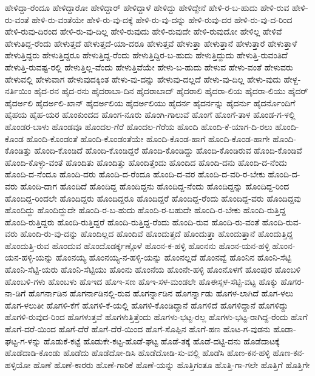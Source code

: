 ಹೇಳಿದ್ದಾ-ರೆಂದೂ
ಹೇಳಿದ್ದಾರೋ
ಹೇಳಿದ್ದಾರ್
ಹೇಳಿದ್ದಾಳೆ
ಹೇಳಿದ್ದು
ಹೇಳಿದ್ದೇನೆ
ಹೇಳಿ-ರ-ಬ-ಹುದು
ಹೇಳಿ-ರುವ
ಹೇಳಿ-ರು-ವಂತೆ
ಹೇಳಿ-ರು-ವಂತೆಯೇ
ಹೇಳಿ-ರು-ವು-ದಕ್ಕೆ
ಹೇಳಿ-ರು-ವು-ದನ್ನು
ಹೇಳಿ-ರುವು-ದರ
ಹೇಳಿ-ರು-ವು-ದ-ರಿಂದ
ಹೇಳಿ-ರುವು-ದಿರಂದ
ಹೇಳಿ-ರು-ವು-ದಿಲ್ಲ
ಹೇಳಿ-ರುವುದು
ಹೇಳಿ-ರುವುದೇ
ಹೇಳಿ-ರುವುದೋ
ಹೇಳಿಲ್ಲ
ಹೇಳಿವೆ
ಹೇಳುತಿದ್ದ-ರೆಂದು
ಹೇಳುತ್ತದೆ
ಹೇಳುತ್ತದೆ-ಯಾ-ದರೂ
ಹೇಳುತ್ತವೆ
ಹೇಳುತ್ತಾ
ಹೇಳುತ್ತಾನೆ
ಹೇಳುತ್ತಾರೆ
ಹೇಳುತ್ತಾಳೆ
ಹೇಳುತ್ತಿದ್ದರು
ಹೇಳುತ್ತಿದ್ದರೂ
ಹೇಳುತ್ತಿದ್ದ-ರೆಂದು
ಹೇಳುತ್ತಿದ್ದಿರ-ಬ-ಹುದು
ಹೇಳುತ್ತಿದ್ದುದು
ಹೇಳುತ್ತಿ-ರುವಂತಿದೆ
ಹೇಳುತ್ತಿ-ರುವಷ್ಟ-ರಲ್ಲಿ
ಹೇಳುತ್ತಿಲ್ಲ-ವೆಂದು
ಹೇಳುತ್ತಿವೆಯೇ
ಹೇಳು-ಬ-ಹುದು
ಹೇಳುವ
ಹೇಳು-ವಂತೆ
ಹೇಳುವರು
ಹೇಳುವಲ್ಲಿ
ಹೇಳುವಾಗ
ಹೇಳುವುದಕ್ಕಿಂತ
ಹೇಳು-ವು-ದನ್ನು
ಹೇಳುವು-ದಲ್ಲದೆ
ಹೇಳು-ವು-ದಿಲ್ಲ
ಹೇಳು-ವುದು
ಹೇಳ್ದ-ನರ್ತಿಯಿಂ
ಹೈದ-ರನ
ಹೈದ-ರನು
ಹೈದರಾಬಾ-ದಿನ
ಹೈದರಾಬಾದ್
ಹೈದರಾಲಿ
ಹೈದರಾ-ಲಿಯ
ಹೈದರಾ-ಲಿಯು
ಹೈದರ್
ಹೈದರ್ಅಲಿ
ಹೈದರ್ಅಲಿ-ಖಾನ್
ಹೈದರ್ಅಲಿಯ
ಹೈದರ್ಅಲಿಯು
ಹೈದರ್ನ
ಹೈದರ್ನನ್ನು
ಹೈದರ್ನು
ಹೈದರ್ನೊಂದಿಗೆ
ಹೈಹಯ
ಹೈಹ-ಯರ
ಹೊಂಕುಂದದ
ಹೊಂಗ-ನೂರು
ಹೊಂಗಿ-ಗಾಲುವೆ
ಹೊಂಗೆ
ಹೊಂಗೆ-ತಾಳ
ಹೊಂಡ-ಗ-ಳಲ್ಲಿ
ಹೊಂಡರ-ಬಾಳು
ಹೊಂಡವೂ
ಹೊಂದಲ-ಗೆರೆ
ಹೊಂದಲ-ಗೆರೆಯ
ಹೊಂದಿ
ಹೊಂದಿ-ಕೆ-ಯಾಗ-ದಿ-ರಲು
ಹೊಂದಿ-ಕೊಂಡ
ಹೊಂದಿ-ಕೊಂಡಂತೆ
ಹೊಂದಿ-ಕೊಂಡಂತೆಯೇ
ಹೊಂದಿ-ಕೊಂಡ-ಹಾಗೆ
ಹೊಂದಿ-ಕೊಂಡ-ಹಾಗೇ
ಹೊಂದಿ-ಕೊಂಡಿತ್ತು
ಹೊಂದಿ-ಕೊಂಡಿದೆ
ಹೊಂದಿ-ಕೊಂಡಿದ್ದರೆ
ಹೊಂದಿ-ಕೊಂಡಿದ್ದು
ಹೊಂದಿ-ಕೊಂಡಿರುವ
ಹೊಂದಿ-ಕೊಂಡಿವೆ
ಹೊಂದಿ-ಕೊಳ್ಳು-ವಂತೆ
ಹೊಂದಿತು
ಹೊಂದಿತ್ತು
ಹೊಂದಿತ್ತೆಂದು
ಹೊಂದಿದ
ಹೊಂದಿ-ದನು
ಹೊಂದಿ-ದ-ನೆಂದು
ಹೊಂದಿ-ದ-ನೆಂದೂ
ಹೊಂದಿ-ದರು
ಹೊಂದಿ-ದ-ರೆಂದೂ
ಹೊಂದಿ-ದ-ವರ
ಹೊಂದಿ-ದ-ವರಿ-ರ-ಬೇಕು
ಹೊಂದಿ-ದ-ವರು
ಹೊಂದಿ-ದಾಗ
ಹೊಂದಿದೆ
ಹೊಂದಿದ್ದ
ಹೊಂದಿದ್ದನು
ಹೊಂದಿದ್ದ-ನೆಂದು
ಹೊಂದಿದ್ದನ್ನು
ಹೊಂದಿದ್ದ-ರಿಂದ
ಹೊಂದಿದ್ದ-ರಿಂದಲೇ
ಹೊಂದಿದ್ದರು
ಹೊಂದಿದ್ದರೂ
ಹೊಂದಿದ್ದರೆ
ಹೊಂದಿದ್ದ-ರೆಂದು
ಹೊಂದಿದ್ದ-ವರು
ಹೊಂದಿದ್ದವು
ಹೊಂದಿದ್ದು
ಹೊಂದಿದ್ದುದೇ
ಹೊಂದಿ-ರ-ಬ-ಹುದು
ಹೊಂದಿ-ರ-ಬಹುದೇ
ಹೊಂದಿ-ರ-ಬೇಕು
ಹೊಂದಿ-ರುತ್ತಿದ್ದ
ಹೊಂದಿ-ರುತ್ತಿದ್ದರು
ಹೊಂದಿ-ರುತ್ತಿದ್ದರೆ
ಹೊಂದಿ-ರುತ್ತಿದ್ದ-ರೆಂದು
ಹೊಂದಿ-ರುವ
ಹೊಂದಿ-ರು-ವಂತೆ
ಹೊಂದಿ-ರುವ-ವರು
ಹೊಂದಿ-ರು-ವು-ದನ್ನು
ಹೊಂದಿಲ್ಲದ
ಹೊಂದಿವೆ
ಹೊಂದುತ್ತದೆ
ಹೊಂದುತ್ತಾ
ಹೊಂದುತ್ತಾನೆ
ಹೊಂದುತ್ತಿದ್ದ
ಹೊಂದುತ್ತಿ-ರುವ
ಹೊಂದುವ
ಹೊಂದೊಡರ್ಕ್ಕಣ್ಗೊಳೆ
ಹೊಂನ-ಕ-ಹಳ್ಳಿ
ಹೊಂನನು
ಹೊಂನ-ಯನ-ಹಳ್ಳಿ
ಹೊಂನ-ಯನ-ಹಳ್ಳಿ-ಯನ್ನು
ಹೊಂನಯ್ಯ
ಹೊಂನಯ್ಯ-ನ-ಹಳ್ಳಿ-ಯನ್ನು
ಹೊಂನಲ್ಲದೆ
ಹೊಂನವ್ವೆ
ಹೊಂನಿನ
ಹೊಂನಿ-ಸೆಟ್ಟಿ
ಹೊಂನಿ-ಸೆಟ್ಟಿ-ಯರು
ಹೊಂನಿ-ಸೆಟ್ಟಿಯು
ಹೊಂನು
ಹೊಂನೆಯ
ಹೊಂನೇ-ಹಳ್ಳಿ
ಹೊಂನೊಳಗೆ
ಹೊಂಪುರ
ಹೊಂಬಳಿ
ಹೊಂಬಳಿ-ಗಳು
ಹೊಂಬಳು
ಹೊಇದ
ಹೊಇ-ಸಣ
ಹೊಇ-ಸಳ-ಮಂಡಲೇ
ಹೊಈಸ್ಸಳ-ಸೆಟ್ಟಿ-ವಟ್ಟ
ಹೊಕ್ಕು
ಹೊಗರ-ನಾ-ಡಿಗೆ
ಹೊಗರ್ನಾಡಿನ
ಹೊಗರ್ನಾಡಿನಲ್ಲಿ-ರುವ
ಹೊಗರ್ನ್ನಾಡಿನ
ಹೊಗರ್ನ್ನಾಡು
ಹೊಗಳ-ಲಾಗಿದೆ
ಹೊಗ-ಳಲು
ಹೊಗ-ಳಲುತೀ
ಹೊಗಳಿ-ಕೆಗೆ
ಹೊಗಳಿ-ಕೆ-ಯಲ್ಲಿ
ಹೊಗಳಿ-ಕೊಂಡಿದ್ದಾನೆ
ಹೊಗಳಿದೆ
ಹೊಗಳಿದ್ದಾನೆ
ಹೊಗಳಿದ್ದು
ಹೊಗಳಿ-ರುವುದ-ರಿಂದ
ಹೊಗಳುತ್ತವೆ
ಹೊಗಳುತ್ತಿತ್ತೆಂದು
ಹೊಗಳು-ಭಟ್ಟ-ರಲ್ಲ
ಹೊಗಳು-ಭಟ್ಟ-ರಾಗಿದ್ದ-ರೆಂದು
ಹೊಗೆ
ಹೊಗೆ-ದರೆ-ಯಿಂದ
ಹೊಗೆ-ದೆರೆ
ಹೊಗೆ-ದೆರೆ-ಯಿಂದ
ಹೊಗೆ-ಸೊಪ್ಪಿನ
ಹೊಗೆ-ಹಣ
ಹೊಟ-ಗ-ವುಡನು
ಹೊಡಾ-ಘಟ್ಟ-ಗ-ಳನ್ನು
ಹೊಡುಕೆ-ಕಟ್ಟೆ
ಹೊಡುಕೇ-ಕಟ್ಟ-ಹೊಡೆ-ಘಟ್ಟ
ಹೊಡೆ-ತಕ್ಕೆ
ಹೊಡೆ-ದಟ್ಟಿ-ದನು
ಹೊಡೆದಾಟಕ್ಕೆ
ಹೊಡೆದಾಡಿ-ಕೊಂಡು
ಹೊಡೆದು
ಹೊಡೆದೋ-ಡಿಸಿ
ಹೊಡೆದೋಡಿ-ಸು-ವಲ್ಲಿ
ಹೊಡೆಸಿ
ಹೊಣ-ಕನ-ಹಳ್ಳಿ
ಹೊಣ-ಕನ-ಹಳ್ಳಿಯೋ
ಹೊಣೆ
ಹೊಣೆ-ಕಾರರು
ಹೊಣೆ-ಗಾರಿಕೆ
ಹೊಣೆ-ಯನ್ನು
ಹೊತ್ತಿಗಂತೂ
ಹೊತ್ತಿ-ಗಾ-ಗಲೇ
ಹೊತ್ತಿಗೆ
ಹೊತ್ತಿಗೇ
